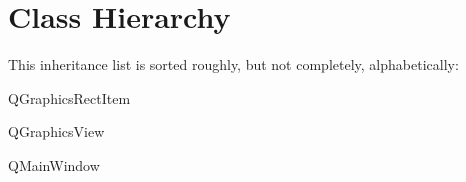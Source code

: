 \section{Class Hierarchy}
This inheritance list is sorted roughly, but not completely, alphabetically\-:\begin{DoxyCompactList}
\item {}
\item Q\-Graphics\-Rect\-Item\begin{DoxyCompactList}
\item {}
\end{DoxyCompactList}
\item Q\-Graphics\-View\begin{DoxyCompactList}
\item {}
\begin{DoxyCompactList}
\item {}
\begin{DoxyCompactList}
\item {}
\end{DoxyCompactList}
\end{DoxyCompactList}
\end{DoxyCompactList}
\item Q\-Main\-Window\begin{DoxyCompactList}
\item {}
\end{DoxyCompactList}
\item {}
\end{DoxyCompactList}
